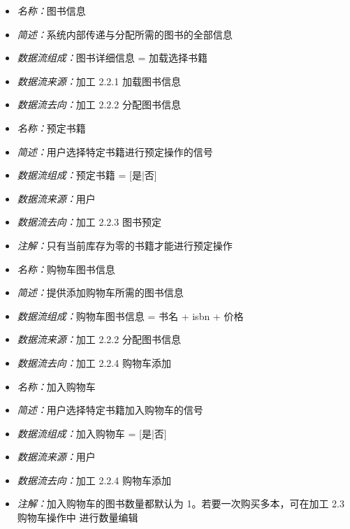 \vspace{-1mm}

\begin{itemize}
	\item \textit{名称：}图书信息
	\item \textit{简述：}系统内部传递与分配所需的图书的全部信息
	\item \textit{数据流组成：}图书详细信息 = 加载选择书籍
	\item \textit{数据流来源：}加工 2.2.1 加载图书信息
	\item \textit{数据流去向：}加工 2.2.2 分配图书信息
\end{itemize}

\vspace{-1mm}

\begin{itemize}
	\item \textit{名称：}预定书籍
	\item \textit{简述：}用户选择特定书籍进行预定操作的信号
	\item \textit{数据流组成：}预定书籍 = [是|否]
	\item \textit{数据流来源：}用户
	\item \textit{数据流去向：}加工 2.2.3 图书预定
	\item \textit{注解：}只有当前库存为零的书籍才能进行预定操作
\end{itemize}

\vspace{-1mm}

\begin{itemize}
	\item \textit{名称：}购物车图书信息
	\item \textit{简述：}提供添加购物车所需的图书信息
	\item \textit{数据流组成：}购物车图书信息  = 书名 + isbn + 价格
	\item \textit{数据流来源：}加工 2.2.2 分配图书信息
	\item \textit{数据流去向：}加工 2.2.4 购物车添加
\end{itemize}

\vspace{-1mm}

\begin{itemize}
	\item \textit{名称：}加入购物车
	\item \textit{简述：}用户选择特定书籍加入购物车的信号
	\item \textit{数据流组成：}加入购物车 = [是|否]
	\item \textit{数据流来源：}用户
	\item \textit{数据流去向：}加工 2.2.4 购物车添加
	\item \textit{注解：}加入购物车的图书数量都默认为 1。若要一次购买多本，可在加工 2.3 购物车操作中	进行数量编辑
\end{itemize}

